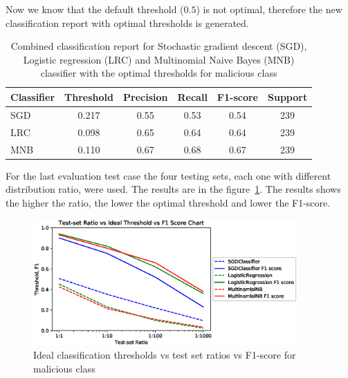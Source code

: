 Now we know that the default threshold (\( 0.5 \)) is not optimal, therefore the new classification report with optimal thresholds is generated.

\begin{table}[htb]
    \centering

    \begin{tabular}{lccccc}
        \toprule
        Classifier & Threshold & Precision & Recall & F1-score & Support \\
        \midrule
        SGD & 0.217 & 0.55 & 0.53 & 0.54 & 239 \\
        LRC & 0.098 & 0.65 & 0.64 & 0.64 & 239 \\
        MNB & 0.110 & 0.67 & 0.68 & 0.67 & 239 \\
        \bottomrule
    \end{tabular}

    \caption{Combined classification report for Stochastic gradient descent (SGD), Logistic regression (LRC) and Multinomial Naive Bayes (MNB) classifier with the optimal thresholds for malicious class}
    \label{table:combined-report-optimal}
\end{table}
\FloatBarrier

For the last evaluation test case the four testing sets, each one with different distribution ratio, were used.
The results are in the figure~\ref{fig:ratios}.
The results shows the higher the ratio, the lower the optimal threshold and lower the F1-score.

\begin{figure}[htb]
    \centering
    \includegraphics[width=0.9\textwidth]{imgs/ratios.eps}
    \caption{Ideal classification thresholds vs test set ratios vs F1-score for malicious class}
    \label{fig:ratios}
\end{figure}
\FloatBarrier



